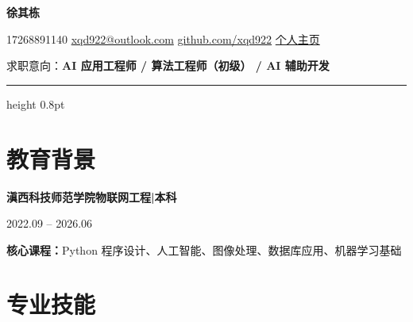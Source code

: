 \documentclass[10pt,a4paper]{article}
\begin{document}
\begin{center}
    {\fontsize{26}{32}\selectfont\bfseries\color{primary} 徐其栋}

    \vspace{0.15em}

    {\color{graytext}
    \faPhone\hspace{0.3em}17268891140
    \hspace{1.0em}
    \faEnvelope\hspace{0.3em}\href{mailto:xqd922@outlook.com}{xqd922@outlook.com}
    \hspace{1.0em}
    \faGithub\hspace{0.3em}\href{https://github.com/xqd922}{github.com/xqd922}
    \hspace{1.0em}
    \faGlobe\hspace{0.3em}\href{https://1001.pp.ua}{个人主页}}

    \vspace{0.5em}

    {\color{darktext} 求职意向：\textbf{\color{primary}AI 应用工程师 / 算法工程师（初级） / AI 辅助开发}}
\end{center}

\vspace{0.2em}
{\color{rulecolor}\hrule height 0.8pt}

\section{\faGraduationCap\hspace{0.4em}教育背景}

{\bfseries 滇西科技师范学院}\hfill{\bfseries 物联网工程\hspace{0.3em}|\hspace{0.3em}本科}

{\color{graytext} 2022.09 -- 2026.06}

\vspace{0.2em}

{\color{darktext}
\textbf{核心课程：}Python 程序设计、人工智能、图像处理、数据库应用、机器学习基础
}

\section{\faCogs\hspace{0.4em}专业技能}
\end{document}
